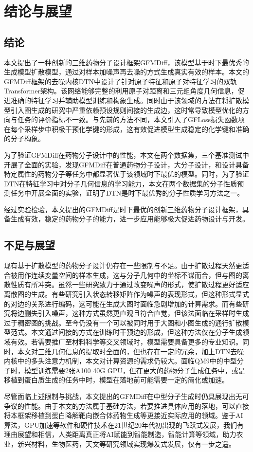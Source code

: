 \chapter{结论与展望}
\label{chap:conclusion}

\section{结论}
本文提出了一种创新的三维药物分子设计框架GFMDiff，该模型基于时下最优秀的生成模型扩散模型，通过对样本加噪声再去噪的方式生成真实有效的样本。本文的GFMDiff框架的去噪内核DTN中设计了针对原子特征和原子对特征学习的双轨Transformer架构。该网络能够完整的利用原子对距离和三元组角度几何信息，促进准确的特征学习并辅助模型训练和构象生成。同时由于该领域的方法在将扩散模型引入图生成的研究中严重依赖预设规则间接的生成边，这时常导致模型优化的方向与任务的评价指标不一致。与先前的方法不同，本文引入了GFLoss损失函数项在每个采样步中积极干预化学键的形成，这有效促进模型生成稳定的化学键和准确的分子构象。

为了验证GFMDiff在药物分子设计中的性能，本文在两个数据集，三个基准测试中开展了全面的实验，发现GFMDiff在普通药物分子设计，大分子设计，和设计具备特定属性的药物分子等任务中都显著优于该领域时下最优的模型。同时，为了验证DTN在特征学习中对分子几何信息的学习能力，本文在两个数据集的分子性质预测任务中开展全面的实验，证明了DTN是时下最优秀的分子性质学习方法之一。

经过实验检验，本文提出的GFMDiff是时下最优的创新三维药物分子设计框架，具备生成有效，稳定的药物分子的能力，进一步应用能够极大促进药物设计与开发。

\section{不足与展望}
现有基于扩散模型的药物分子设计仍存在一些限制与不足。由于扩散过程天然更适合被用作连续变量空间的样本生成，这与分子几何中的坐标不谋而合，但与图的离散性质有所冲突。虽然一些研究致力于通过改变噪声的形式，使扩散过程更好适应离散图的生成。有些研究引入状态转移矩阵作为噪声的表现形式，但这种形式显式的对边的关系进行编码，这可能在生成大图时面临急剧增加的计算需求。而有些研究将边删失引入噪声，这种方式虽然更直观且符合直觉，但该法面临在采样时生成过于稠密图的挑战。至今仍没有一个可以被同时用于大图和小图生成的通行扩散模型范式。本文通过间接的方式在训练时干预边的形成，但这种方法仅在分子生成领域有效。若需要推广至材料科学等交叉领域时，模型需要具备更多的专业知识。同时，本文对三维几何信息的提取时全面的，但也存在一定的冗余，加上DTN去噪内核中的多头注意力机制，本文对计算资源的需求仍较大。面临QM9中的中型分子时，模型训练需要2张A100 40G GPU，但在更大的药物分子生成任务中，或是移植到蛋白质生成的任务中时，模型在落地前可能需要一定的简化或加速。

尽管面临上述限制与挑战，本文提出的GFMDiff在中型分子生成时仍具展现出无可争议的性能。由于本文的方法属于基础方法，若要推进具体应用的落地，可以直接将本框架移植到蛋白降解靶向嵌合体药物生成等更接近实际应用的领域。鉴于AI算法，GPU加速等软件和硬件技术在21世纪20年代初出现的飞跃式发展，我们有理由展望和相信，人类距离真正将AI赋能到智能制造，智能计算等领域，助力农业，新兴材料，生物医药，天文等研究领域实现爆发式发展，仅有一步之遥。